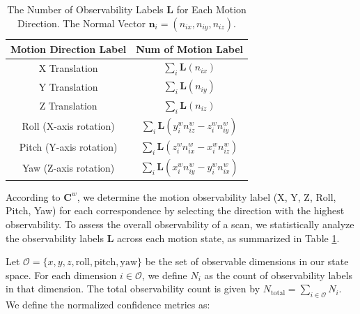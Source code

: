 \begin{table}[h]
    \centering
    \begingroup
    \setlength{\arrayrulewidth}{0.8pt} %
    \renewcommand{\arraystretch}{1.5} %
    \setlength{\tabcolsep}{12pt} %
    \begin{tabular}{|c|c|}
        \hline
        \textbf{Motion Direction Label} & \textbf{Num of Motion Label} \\
        \hline
      X Translation & \( \sum_i \mathbf{L}(n_{ix}) \) \\
        \hline
        Y Translation & \( \sum_i \mathbf{L}(n_{iy}) \) \\
        \hline
        Z Translation & \( \sum_i \mathbf{L}(n_{iz}) \) \\
        \hline
        Roll (X-axis rotation) & \( \sum_i \mathbf{L}(y_i^w n_{iz}^w - z_i^w n_{iy}^w) \) \\
        \hline
        Pitch (Y-axis rotation) & \( \sum_i \mathbf{L}(z_i^w n_{ix}^w - x_i^w n_{iz}^w) \) \\
        \hline
        Yaw (Z-axis rotation) & \( \sum_i \mathbf{L}(x_i^w n_{iy}^w - y_i^w n_{ix}^w) \) \\
        \hline
    \end{tabular}
    \endgroup
    \caption{ The Number of Observability Labels $\mathbf{L}$ for Each Motion Direction. The Normal Vector $\mathbf{n}_i = (n_{ix}, n_{iy}, n_{iz})$. }
    \label{tab:observability_conditions}
\end{table}





According to \( \mathbf{C}^w \), we determine the motion observability label (X, Y, Z, Roll, Pitch, Yaw) for each correspondence by selecting the direction with the highest observability. To assess the overall observability of a scan, we statistically analyze the observability labels $\mathbf{L}$ across each motion state, as summarized in Table \ref{tab:observability_conditions}.



Let $\mathcal{O} = \{x, y, z, \text{roll}, \text{pitch}, \text{yaw}\}$ be the set of observable dimensions in our state space. For each dimension $i \in \mathcal{O}$, we define $N_i$ as the count of observability labels in that dimension.
The total observability count is given by $N_{\text{total}} = \sum_{i \in \mathcal{O}} N_i$. We define the normalized confidence metrics as:

